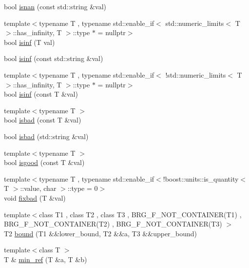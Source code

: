 \begin{DoxyCompactItemize}
\item 
bool \hyperlink{namespaceIceBRG_a027dae62449c386354edc015ff2ad4c3}{isnan} (const std\+::string \&val)
\item 
{\footnotesize template$<$typename T , typename std\+::enable\+\_\+if$<$ std\+::numeric\+\_\+limits$<$ T $>$\+::has\+\_\+infinity, T $>$\+::type $\ast$  = nullptr$>$ }\\bool \hyperlink{namespaceIceBRG_a4cb3be60db622e1725dd98f1d2a9426e}{isinf} (T val)
\item 
bool \hyperlink{namespaceIceBRG_aaa4ce17f7d4a69e37d9938a884e59e0b}{isinf} (const std\+::string \&val)
\item 
{\footnotesize template$<$typename T , typename std\+::enable\+\_\+if$<$ !std\+::numeric\+\_\+limits$<$ T $>$\+::has\+\_\+infinity, T $>$\+::type $\ast$  = nullptr$>$ }\\bool \hyperlink{namespaceIceBRG_a1de0e89c2b5cbac3986540f5de1aba7b}{isinf} (const T \&val)
\item 
{\footnotesize template$<$typename T $>$ }\\bool \hyperlink{namespaceIceBRG_a9f5f5e14a09c77d24762abb9a9113c44}{isbad} (const T \&val)
\item 
bool \hyperlink{namespaceIceBRG_ae949c431603e4a17fca77492139a5588}{isbad} (std\+::string \&val)
\item 
{\footnotesize template$<$typename T $>$ }\\bool \hyperlink{namespaceIceBRG_a7753729aa16c554765dc86e409d093b0}{isgood} (const T \&val)
\item 
{\footnotesize template$<$typename T , typename std\+::enable\+\_\+if$<$!boost\+::units\+::is\+\_\+quantity$<$ T $>$\+::value, char $>$\+::type  = 0$>$ }\\void \hyperlink{namespaceIceBRG_a8a20b03a1a9e2b214eb673dd7b999f6c}{fixbad} (T \&val)
\item 
{\footnotesize template$<$class T1 , class T2 , class T3 , B\+R\+G\+\_\+\+F\+\_\+\+N\+O\+T\+\_\+\+C\+O\+N\+T\+A\+I\+N\+E\+R(\+T1) , B\+R\+G\+\_\+\+F\+\_\+\+N\+O\+T\+\_\+\+C\+O\+N\+T\+A\+I\+N\+E\+R(\+T2) , B\+R\+G\+\_\+\+F\+\_\+\+N\+O\+T\+\_\+\+C\+O\+N\+T\+A\+I\+N\+E\+R(\+T3) $>$ }\\T2 \hyperlink{namespaceIceBRG_a44be96a2452436d8bc78acc2f1c74daf}{bound} (T1 \&\&lower\+\_\+bound, T2 \&\&a, T3 \&\&upper\+\_\+bound)
\item 
{\footnotesize template$<$class T $>$ }\\T \& \hyperlink{namespaceIceBRG_a8b6724cfb5d64ace2a219237a6897988}{min\+\_\+ref} (T \&a, T \&b)

\end{DoxyCompactItemize}

